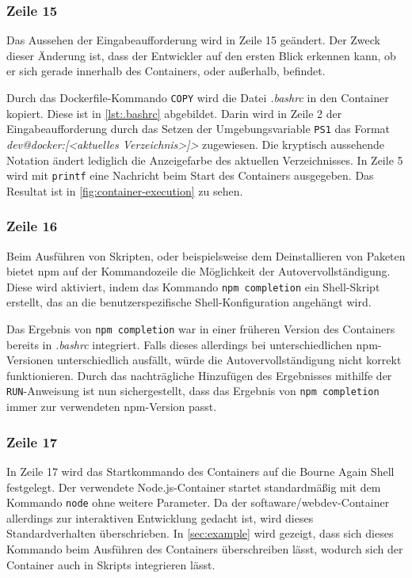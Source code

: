 \subsubsection {Zeile 15}
Das Aussehen der Eingabeaufforderung wird in Zeile 15 geändert.
Der Zweck dieser Änderung ist, dass der Entwickler auf den ersten Blick erkennen kann, ob er sich gerade innerhalb des Containers, oder außerhalb, befindet.

Durch das Dockerfile-Kommando \verb|COPY| wird die Datei \emph{.bashrc} in den Container kopiert.
Diese ist in \cref{lst:.bashrc} abgebildet.
Darin wird in Zeile 2 der Eingabeaufforderung durch das Setzen der Umgebungsvariable \verb|PS1| das Format \emph{dev@docker:[<aktuelles Verzeichnis>]>} zugewiesen.
Die kryptisch aussehende Notation ändert lediglich die Anzeigefarbe des aktuellen Verzeichnisses.
In Zeile 5 wird mit \verb|printf| eine Nachricht beim Start des Containers ausgegeben.
Das Resultat ist in \cref{fig:container-execution} zu sehen.

\subsubsection {Zeile 16}
Beim Ausführen von Skripten, oder beispielsweise dem Deinstallieren von Paketen bietet npm auf der Kommandozeile die Möglichkeit der Autovervollständigung.
Diese wird aktiviert, indem das Kommando \verb|npm completion| ein Shell-Skript erstellt, das an die benutzerspezifische Shell-Konfiguration angehängt wird.

Das Ergebnis von \verb|npm completion| war in einer früheren Version des Containers bereits in \emph{.bashrc} integriert.
Falls dieses allerdings bei unterschiedlichen npm-Versionen unterschiedlich ausfällt, würde die Autovervollständigung nicht korrekt funktionieren.
Durch das nachträgliche Hinzufügen des Ergebnisses mithilfe der \verb|RUN|-Anweisung ist nun sichergestellt, dass das Ergebnis von \verb|npm completion| immer zur verwendeten npm-Version passt.

\subsubsection {Zeile 17}
In Zeile 17 wird das Startkommando des Containers auf die Bourne Again Shell festgelegt.
Der verwendete Node.js-Container startet standardmäßig mit dem Kommando \verb|node| ohne weitere Parameter.
Da der softaware/webdev-Container allerdings zur interaktiven Entwicklung gedacht ist, wird dieses Standardverhalten überschrieben.
In \cref{sec:example} wird gezeigt, dass sich dieses Kommando beim Ausführen des Containers überschreiben lässt, wodurch sich der Container auch in Skripts integrieren lässt.

